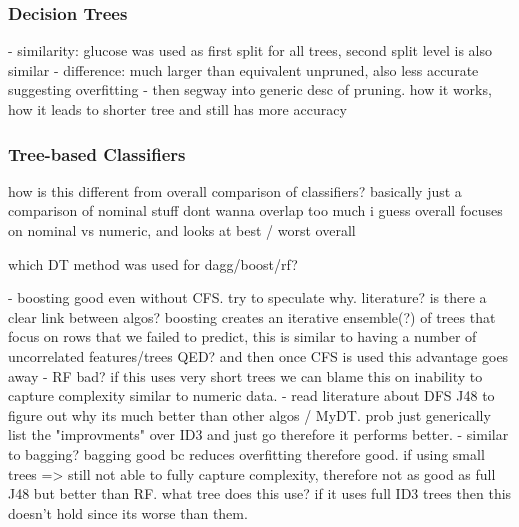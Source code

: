 \subsubsection{Decision Trees}





- similarity: glucose was used as first split for all trees, second split level is also similar
- difference: much larger than equivalent unpruned, also less accurate suggesting overfitting
- then segway into generic desc of pruning. how it works, how it leads to shorter tree and still has more accuracy



\subsubsection{Tree-based Classifiers}


how is this different from overall comparison of classifiers? basically just a comparison of nominal stuff
dont wanna overlap too much
i guess overall focuses on nominal vs numeric, and looks at best / worst overall

which DT method was used for dagg/boost/rf?


- boosting good even without CFS. try to speculate why. literature? is there a clear link between algos? boosting creates an iterative ensemble(?) of trees that focus on rows that we failed to predict, this is similar to having a number of uncorrelated features/trees QED? and then once CFS is used this advantage goes away
- RF bad? if this uses very short trees we can blame this on inability to capture complexity similar to numeric data.
- read literature about DFS J48 to figure out why its much better than other algos / MyDT. prob just generically list the "improvments" over ID3 and just go therefore it performs better.
- similar to bagging? bagging good bc reduces overfitting therefore good. if using small trees => still not able to fully capture complexity, therefore not as good as full J48 but better than RF. what tree does this use? if it uses full ID3 trees then this doesn't hold since its worse than them.


